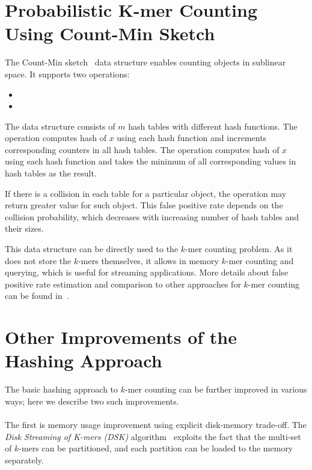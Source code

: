 \section[Probabilistic K-mer Counting]{Probabilistic K-mer Counting Using Count-Min Sketch}

The Count-Min sketch~\cite{countminsketch} data structure enables counting objects in sublinear space. It supports two operations:
\begin{itemize}
  \item {} %
  \item {} %
\end{itemize}

The data structure consists of $m$ hash tables with different hash functions.
The  operation computes hash of $x$ using each hash function and increments corresponding counters in all hash tables. The  operation computes hash of $x$ using each hash function and takes the minimum of all corresponding values in hash tables as the result. %

If there is a collision in each table for a particular object, the  operation may return greater value for such object. This false positive rate depends on the collision probability, which decreases with increasing number of hash tables and their sizes.

This data structure can be directly used to the $k$-mer counting problem. As it does not store the $k$-mers themselves, it allows in memory $k$-mer counting and querying, which is useful for streaming applications.
More details about false positive rate estimation and comparison to other approaches for $k$-mer counting can be found in~\cite{khmer}.

\section[Other Improvements]{Other Improvements of the Hashing Approach}

The basic hashing approach to $k$-mer counting can be further improved in various ways; here we describe two such improvements.

\paragraph{} The first is memory usage improvement using explicit disk-memory trade-off. The \emph{Disk Streaming of K-mers (DSK)} algorithm~\cite{dsk} exploits the fact that the multi-set of $k$-mers can be partitioned, and each partition can be loaded to the memory separately.

